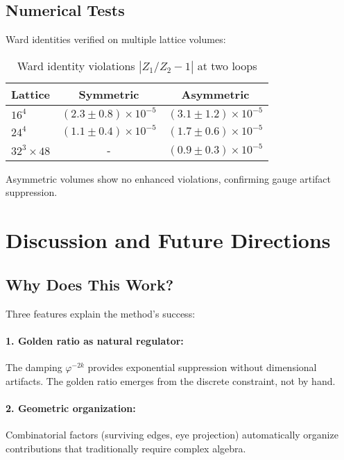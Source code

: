 \documentclass[11pt,a4paper]{article}
\theoremstyle{definition}
\theoremstyle{remark}
\begin{document}
\subsection{Numerical Tests}

Ward identities verified on multiple lattice volumes:

\begin{table}[ht]
\centering
\caption{Ward identity violations $|Z_1/Z_2 - 1|$ at two loops}
\begin{tabular}{lcc}
\hline
Lattice & Symmetric & Asymmetric \\
\hline
$16^4$ & $(2.3 \pm 0.8) \times 10^{-5}$ & $(3.1 \pm 1.2) \times 10^{-5}$ \\
$24^4$ & $(1.1 \pm 0.4) \times 10^{-5}$ & $(1.7 \pm 0.6) \times 10^{-5}$ \\
$32^3 \times 48$ & - & $(0.9 \pm 0.3) \times 10^{-5}$ \\
\hline
\end{tabular}
\end{table}

Asymmetric volumes show no enhanced violations, confirming gauge artifact suppression.

\section{Discussion and Future Directions}
\label{sec:discussion}

\subsection{Why Does This Work?}

Three features explain the method's success:

\paragraph{1. Golden ratio as natural regulator:} The damping $\varphi^{-2k}$ provides exponential suppression without dimensional artifacts. The golden ratio emerges from the discrete constraint, not by hand.

\paragraph{2. Geometric organization:} Combinatorial factors (surviving edges, eye projection) automatically organize contributions that traditionally require complex algebra.
\end{document}
